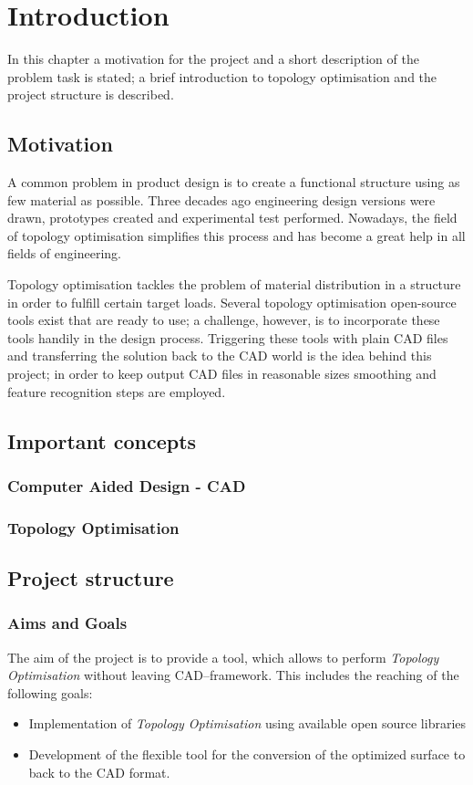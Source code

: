 \chapter{Introduction}
\label{chapter:Introduction}

In this chapter a motivation for the project and a short description of the problem task is stated; a brief introduction to topology optimisation and the project structure is described.
\section{Motivation}
A common problem in product design is to create a functional structure using as few material as possible. Three decades ago engineering design versions were drawn, prototypes created and experimental test performed. Nowadays, the field of topology optimisation simplifies this process and has become a great help in all fields of engineering. 

Topology optimisation tackles the problem of material distribution in a structure in order to fulfill certain target loads. Several topology optimisation open-source tools exist that are ready to use; a challenge, however, is to incorporate these tools handily in the design process. Triggering these tools with plain CAD files and transferring the solution back to the CAD world is the idea behind this project; in order to keep output CAD files in reasonable sizes smoothing and feature recognition steps are employed.

\section{Important concepts}

\subsection{Computer Aided Design - CAD}

\subsection{Topology Optimisation}

\section{Project structure}
\subsection{Aims and Goals}
The aim of the project is to provide a tool, which allows to perform \textit{Topology Optimisation} without leaving CAD--framework. This includes the reaching of the following goals:
\begin{itemize}
\item Implementation of \textit{Topology Optimisation} using available open source libraries
\item Development of the flexible tool for the conversion of the optimized surface to back to the CAD format.
\end{itemize}
